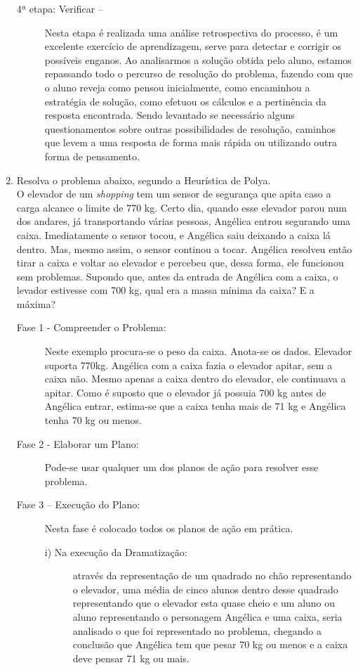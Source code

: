 \documentclass[a4paper, 12pt]{article}
\begin{document}
\begin{enumerate}
\begin{description}
  \item[4ª etapa: Verificar –]
    Nesta etapa é realizada uma análise retrospectiva do processo, é um excelente exercício de aprendizagem, serve para detectar e corrigir os possíveis enganos. Ao analisarmos a solução obtida pelo aluno, estamos repassando todo o percurso de resolução do problema, fazendo com que o aluno reveja como pensou inicialmente, como encaminhou a estratégia de solução, como efetuou os cálculos e a pertinência da resposta encontrada. Sendo levantado se necessário alguns questionamentos sobre outras possibilidades de resolução, caminhos que levem a uma resposta de forma mais rápida ou utilizando outra forma de pensamento. 
  \end{description}  

\item Resolva o problema abaixo, segundo a Heurística de Polya. \\
  O elevador de um \textit{shopping} tem um sensor de segurança que apita caso a carga alcance o limite de 770 kg. Certo dia, quando esse elevador parou num dos andares, já transportando várias pessoas, Angélica entrou segurando uma caixa. Imediatamente o sensor tocou, e Angélica saiu deixando a caixa lá dentro. Mas, mesmo assim, o sensor continou a tocar. Angélica resolveu então tirar a caixa e voltar ao elevador e percebeu que, dessa forma, ele funcionou sem problemas. Supondo que, antes da entrada de Angélica com a caixa, o levador estivesse com 700 kg, qual era a massa mínima da caixa? E a máxima?
  \begin{description}
  \item[Fase 1 - Compreender o Problema:]
    Neste exemplo procura-se o peso da caixa. Anota-se os dados. Elevador suporta 770kg. Angélica com a caixa fazia o elevador apitar, sem a caixa não. Mesmo apenas a caixa dentro do elevador, ele continuava a apitar. Como é suposto que o elevador já possuia 700 kg antes de Angélica entrar, estima-se que a caixa tenha mais de 71 kg e Angélica tenha 70 kg ou menos. 
  \item[Fase 2 - Elaborar um Plano:] Pode-se usar qualquer um dos planos de ação para resolver esse problema.
  \item[Fase 3 – Execução do Plano:] Nesta fase é colocado todos os planos de ação em prática.
    \begin{description}
    \item[i) Na execução da Dramatização:] através da representação de um quadrado no chão representando o elevador, uma média de cinco alunos dentro desse quadrado representando que o elevador esta quase cheio e um aluno ou aluno representando o personagem Angélica e uma caixa, seria analisado o que foi representado no problema, chegando a conclusão que Angélica tem que pesar 70 kg ou menos e a caixa deve pensar 71 kg ou mais.

\end{description}
\end{description}
\end{enumerate}
\end{document}
